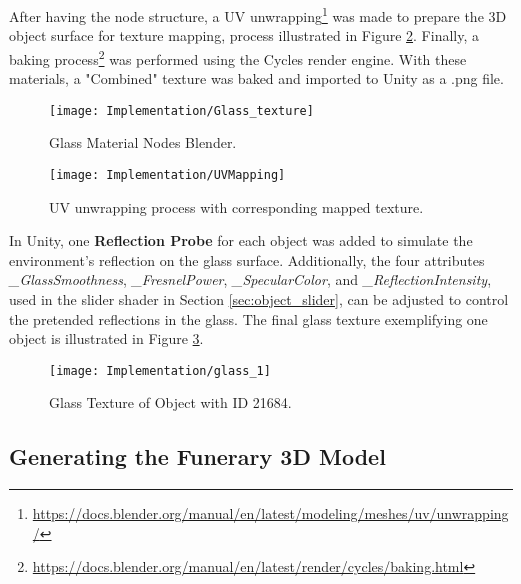 After having the node structure, a UV unwrapping\footnote {\url{https://docs.blender.org/manual/en/latest/modeling/meshes/uv/unwrapping/}} was made to prepare the \gls{3D} object surface for texture mapping, process illustrated in Figure \ref{fig:uv_process}.
 Finally, a baking process\footnote{\url{https://docs.blender.org/manual/en/latest/render/cycles/baking.html}} was performed using the Cycles render engine.
With these materials, a "Combined" texture was baked and imported to Unity as a .png file.

 \begin{figure}[h!]
    \centering
    \texttt{[image: Implementation/Glass\_texture]}
    \caption{Glass Material Nodes Blender.}
    \label{fig:glass_texture}    
\end{figure}


\begin{figure}[h!]
    \centering
    \texttt{[image: Implementation/UVMapping]}
    \caption{UV unwrapping process with corresponding mapped texture.}
    \label{fig:uv_process}
\end{figure}


In Unity, one \textbf{Reflection Probe} for each object was added to simulate the environment's reflection on the glass surface.
Additionally, the four attributes \emph{\_GlassSmoothness}, \emph{\_FresnelPower}, \emph{\_SpecularColor}, and \emph{\_ReflectionIntensity}, used in the slider shader in Section \ref{sec:object_slider}, can be adjusted to control the pretended reflections in the glass.
The final glass texture exemplifying one object is illustrated in Figure \ref{fig:glass1}.

\begin{figure}[h!]
    \centering
    \texttt{[image: Implementation/glass\_1]}
    \caption{Glass Texture of Object with ID 21684.}
    \label{fig:glass1}
\end{figure}



\subsection{Generating the Funerary \gls{3D} Model}
\label{sec:build_model}

